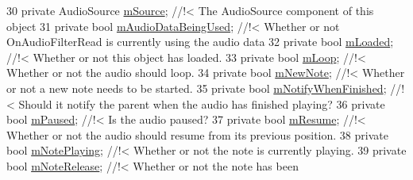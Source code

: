 \begin{DoxyCodeInclude}
30     \textcolor{keyword}{private} AudioSource                \hyperlink{group___n_o_o_priv_var_gad5e14a91b348e61166dbf6b6cf13649c}{mSource}; \textcolor{comment}{//!< The AudioSource component of this object}
31 \textcolor{comment}{}    \textcolor{keyword}{private} \textcolor{keywordtype}{bool}                       \hyperlink{group___n_o_o_priv_var_ga1efa96121f085b27c7d9e8725f90a336}{mAudioDataBeingUsed}; \textcolor{comment}{//!< Whether or not
       OnAudioFilterRead is currently using the audio data}
32 \textcolor{comment}{}    \textcolor{keyword}{private} \textcolor{keywordtype}{bool}                       \hyperlink{group___n_o_o_priv_var_gaf01d2583555de6a523cdf82808718ca9}{mLoaded}; \textcolor{comment}{//!< Whether or not this object has loaded.}
33 \textcolor{comment}{}    \textcolor{keyword}{private} \textcolor{keywordtype}{bool}                       \hyperlink{group___n_o_o_priv_var_gabf1d5013f44773e9fd3e4dbb59d74aeb}{mLoop}; \textcolor{comment}{//!< Whether or not the audio should loop.}
34 \textcolor{comment}{}    \textcolor{keyword}{private} \textcolor{keywordtype}{bool}                       \hyperlink{group___n_o_o_priv_var_gac537ec036adf0645dca2f31fbc5b3dec}{mNewNote}; \textcolor{comment}{//!< Whether or not a new note needs to be
       started.}
35 \textcolor{comment}{}    \textcolor{keyword}{private} \textcolor{keywordtype}{bool}                       \hyperlink{group___n_o_o_priv_var_gaf72dd5943487433966b20b973be1e8b3}{mNotifyWhenFinished}; \textcolor{comment}{//!< Should it notify the
       parent when the audio has finished playing?}
36 \textcolor{comment}{}    \textcolor{keyword}{private} \textcolor{keywordtype}{bool}                       \hyperlink{group___n_o_o_priv_var_ga50fe6047e6a199215fc70b9fc78ac7eb}{mPaused}; \textcolor{comment}{//!< Is the audio paused?}
37 \textcolor{comment}{}    \textcolor{keyword}{private} \textcolor{keywordtype}{bool}                       \hyperlink{group___n_o_o_priv_var_ga1f7a31f1aefc1633f1f435e3438a1efb}{mResume}; \textcolor{comment}{//!< Whether or not the audio should resume from its
       previous position.}
38 \textcolor{comment}{}    \textcolor{keyword}{private} \textcolor{keywordtype}{bool}                       \hyperlink{group___n_o_o_priv_var_ga4417170b8fa977f05a0b4cd0d16412fd}{mNotePlaying}; \textcolor{comment}{//!< Whether or not the note is currently
       playing.}
39 \textcolor{comment}{}    \textcolor{keyword}{private} \textcolor{keywordtype}{bool}                       \hyperlink{group___n_o_o_priv_var_ga88bfcc80d0cd20c81cd89d19d3231b84}{mNoteRelease}; \textcolor{comment}{//!< Whether or not the note has been
}
\end{DoxyCodeInclude}
